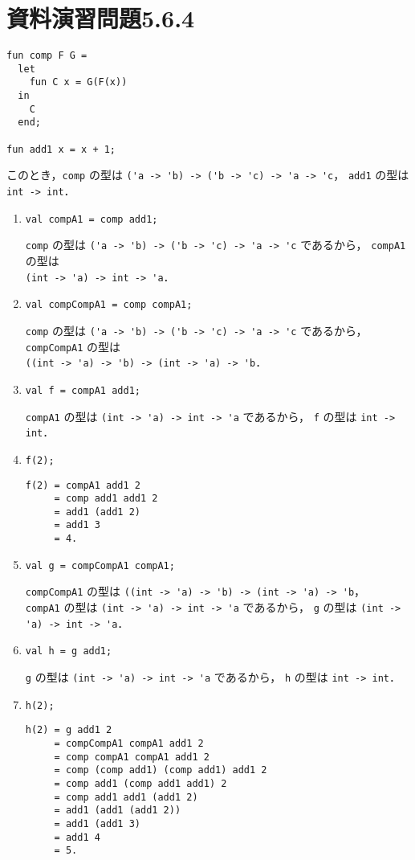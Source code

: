 \documentclass[a4paper, lualatex, ja=standard]{bxjsarticle}
\begin{document}
\section{資料演習問題5.6.4}

\begin{verbatim}
fun comp F G =
  let
    fun C x = G(F(x))
  in
    C
  end;

fun add1 x = x + 1;
\end{verbatim}
このとき，\verb|comp| の型は \verb|('a -> 'b) -> ('b -> 'c) -> 'a -> 'c|，
\verb|add1| の型は \verb|int -> int|．

\begin{enumerate}[label=\alph*)]
\item \verb|val compA1 = comp add1;|

  \verb|comp| の型は \verb|('a -> 'b) -> ('b -> 'c) -> 'a -> 'c| であるから，
  \verb|compA1| の型は \\ \verb|(int -> 'a) -> int -> 'a|．

\item \verb|val compCompA1 = comp compA1;|

  \verb|comp| の型は \verb|('a -> 'b) -> ('b -> 'c) -> 'a -> 'c| であるから，
  \verb|compCompA1| の型は \\ \verb|((int -> 'a) -> 'b) -> (int -> 'a) -> 'b|．

\item \verb|val f = compA1 add1;|

  \verb|compA1| の型は \verb|(int -> 'a) -> int -> 'a| であるから，
  \verb|f| の型は \verb|int -> int|．

\item \verb|f(2);|

\begin{verbatim}
f(2) = compA1 add1 2
     = comp add1 add1 2
     = add1 (add1 2)
     = add1 3
     = 4.
\end{verbatim}

\item \verb|val g = compCompA1 compA1;|

  \verb|compCompA1| の型は
  \verb|((int -> 'a) -> 'b) -> (int -> 'a) -> 'b|，\\
  \verb|compA1| の型は \verb|(int -> 'a) -> int -> 'a| であるから，
  \verb|g| の型は \verb|(int -> 'a) -> int -> 'a|．

\item \verb|val h = g add1;|

  \verb|g| の型は \verb|(int -> 'a) -> int -> 'a| であるから，
  \verb|h| の型は \verb|int -> int|．

\item \verb|h(2);|

\begin{verbatim}
h(2) = g add1 2
     = compCompA1 compA1 add1 2
     = comp compA1 compA1 add1 2
     = comp (comp add1) (comp add1) add1 2
     = comp add1 (comp add1 add1) 2
     = comp add1 add1 (add1 2)
     = add1 (add1 (add1 2))
     = add1 (add1 3)
     = add1 4
     = 5.
\end{verbatim}
\end{enumerate}
\end{document}
